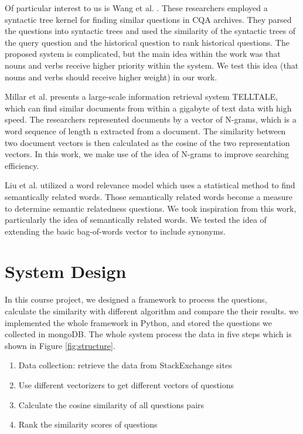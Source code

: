 \documentclass{acm_proc_article-sp}
\begin{document}
Of particular interest to us is Wang et al. \cite{wang2009syntactic}. These researchers employed a syntactic tree kernel for finding similar questions in CQA archives. They parsed the questions into syntactic trees and used the similarity of the syntactic trees of the query question and the historical question to rank historical questions. The proposed system is complicated, but the main idea within the work was that nouns and verbs receive higher priority within the system. We test this idea (that nouns and verbs should receive higher weight) in our work.

Millar et al. \cite {millar2006performance} presents a large-scale information retrieval system TELLTALE, which can find similar documents from within a gigabyte of text data with high speed.  The researchers represented documents by a vector of N-grams, which is a word sequence of length n extracted from a document. The similarity between two document vectors is then calculated as the cosine of the two representation vectors. In this work, we make use of the idea of N-grams to improve searching efficiency.
 
Liu et al. \cite{liu2009searching} utilized a word relevance model which uses a  statistical method to find semantically related words. Those semantically related words become a measure to determine semantic relatedness questions. We took inspiration from this work, particularly the idea of semantically related words. We tested the idea of extending the basic bag-of-words vector to include synonyms. 






\section{System Design}
In this course project, we designed a framework to process the questions, 
calculate the similarity with different algorithm and compare the their results. 
we implemented the whole framework in Python, and stored the questions we collected in mongoDB.  
The whole system process the data in five steps which  is shown in Figure \ref{fig:structure}.
\begin{enumerate}[noitemsep]
	\item Data collection:  retrieve the data from StackExchange sites 
	\item Use different vectorizers to get different vectors of questions 
	\item Calculate the cosine similarity of all questions pairs
	\item Rank  the similarity scores of questions
\end{enumerate}
\end{document}
